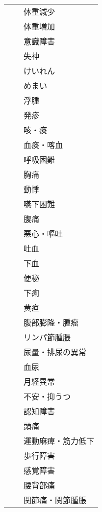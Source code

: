 \begin{xltabular}{\linewidth}{XXX}
 &  & 体重減少 \\
 &  & 体重増加 \\
 &  & 意識障害 \\
 &  & 失神 \\
 &  & けいれん \\
 &  & めまい \\
 &  & 浮腫 \\
 &  & 発疹 \\
 &  & 咳・痰 \\
 &  & 血痰・喀血 \\
 &  & 呼吸困難 \\
 &  & 胸痛 \\
 &  & 動悸 \\
 &  & 嚥下困難 \\
 &  & 腹痛 \\
 &  & 悪心・嘔吐 \\
 &  & 吐血 \\
 &  & 下血 \\
 &  & 便秘 \\
 &  & 下痢 \\
 &  & 黄疸 \\
 &  & 腹部膨隆・腫瘤 \\
 &  & リンパ節腫脹 \\
 &  & 尿量・排尿の異常 \\
 &  & 血尿 \\
 &  & 月経異常 \\
 &  & 不安・抑うつ \\
 &  & 認知障害 \\
 &  & 頭痛 \\
 &  & 運動麻痺・筋力低下 \\
 &  & 歩行障害 \\
 &  & 感覚障害 \\
 &  & 腰背部痛 \\
 &  & 関節痛・関節腫脹 \\
\bottomrule
\end{xltabular}


